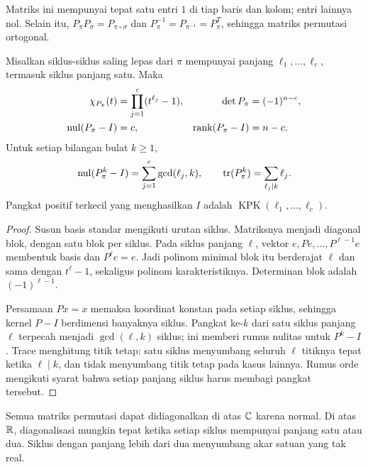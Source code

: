 Matriks ini mempunyai tepat satu entri $1$ di tiap baris dan kolom;
entri lainnya nol. Selain itu,
$P_\pi P_\sigma=P_{\pi\circ\sigma}$ dan
$P_\pi^{-1}=P_{\pi^{-1}}=P_\pi^T$, sehingga matriks permutasi ortogonal.

\begin{teorema}
    Misalkan siklus-siklus saling lepas dari $\pi$ mempunyai panjang
    $\ell_1,\ldots,\ell_c$, termasuk siklus panjang satu. Maka
    \begin{align*}
        \chi_{P_\pi}(t)&=\prod_{j=1}^c(t^{\ell_j}-1),&
        \det P_\pi&=(-1)^{n-c},\\
        \operatorname{nul}(P_\pi-I)&=c,&\operatorname{rank}(P_\pi-I)&=n-c.
    \end{align*}
    Untuk setiap bilangan bulat $k\ge1$,
    \[
        \operatorname{nul}(P_\pi^k-I)=\sum_{j=1}^c\gcd(\ell_j,k),
        \qquad
        \operatorname{tr}(P_\pi^k)=\sum_{\ell_j\mid k}\ell_j.
    \]
    Pangkat positif terkecil yang menghasilkan $I$ adalah
    $\operatorname{KPK}(\ell_1,\ldots,\ell_c)$.
\end{teorema}
\begin{proof}
    Susun basis standar mengikuti urutan siklus. Matriksnya menjadi
    diagonal blok, dengan satu blok per siklus. Pada siklus panjang
    $\ell$, vektor $e,P e,\ldots,P^{\ell-1}e$ membentuk basis dan
    $P^\ell e=e$. Jadi polinom minimal blok itu berderajat $\ell$
    dan sama dengan $t^\ell-1$, sekaligus polinom karakteristiknya.
    Determinan blok adalah $(-1)^{\ell-1}$.

    Persamaan $Px=x$ memaksa koordinat konstan pada setiap siklus,
    sehingga kernel $P-I$ berdimensi banyaknya siklus.
    Pangkat ke-$k$ dari satu siklus panjang $\ell$ terpecah menjadi
    $\gcd(\ell,k)$ siklus; ini memberi rumus nulitas untuk $P^k-I$.
    Trace menghitung titik tetap: satu siklus menyumbang seluruh
    $\ell$ titiknya tepat ketika $\ell\mid k$, dan tidak menyumbang
    titik tetap pada kasus lainnya. Rumus orde mengikuti syarat
    bahwa setiap panjang siklus harus membagi pangkat tersebut.
\end{proof}

Semua matriks permutasi dapat didiagonalkan di atas $\mathbb{C}$ karena
normal. Di atas $\mathbb{R}$, diagonalisasi mungkin tepat ketika setiap
siklus mempunyai panjang satu atau dua. Siklus dengan panjang
lebih dari dua menyumbang akar satuan yang tak real.

